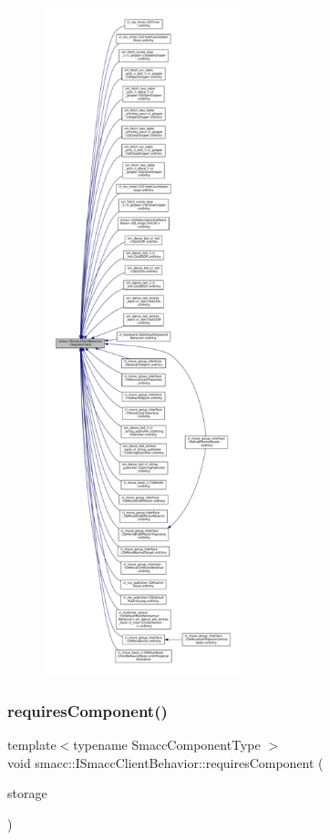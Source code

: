 \begin{figure}[H]
\begin{center}
\leavevmode
\includegraphics[height=550pt]{classsmacc_1_1ISmaccClientBehavior_a32b16e99e3b4cb289414203dc861a440_icgraph}
\end{center}
\end{figure}
\mbox{\label{classsmacc_1_1ISmaccClientBehavior_a19c6d658c8e809bb93bfdc9b639a3ac3}} 
\subsubsection{\texorpdfstring{requires\+Component()}{requiresComponent()}}
{\footnotesize\ttfamily template$<$typename Smacc\+Component\+Type $>$ \\
void smacc\+::\+I\+Smacc\+Client\+Behavior\+::requires\+Component (\begin{DoxyParamCaption}\item[{Smacc\+Component\+Type $\ast$\&}]{storage }\end{DoxyParamCaption})}



